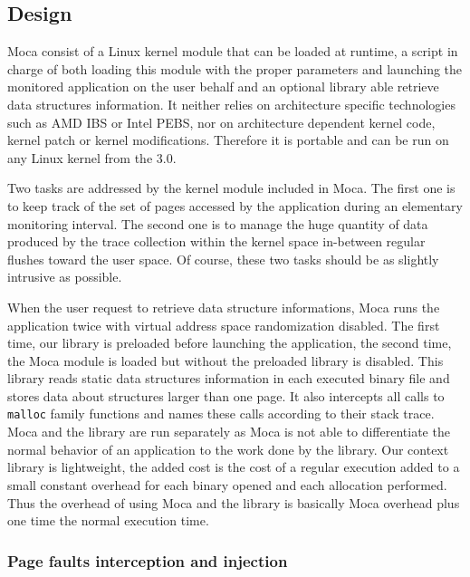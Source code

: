 \subsection{Design}

\gls{Moca} consist of a Linux kernel module that can be loaded at runtime,  a script in charge of both loading this module with the proper parameters and launching the monitored application on the user behalf and an optional library able retrieve data structures information.
It neither relies on architecture specific technologies such as \gls{AMD} \gls{IBS} or \gls{Intel} \gls{PEBS}, nor on architecture dependent kernel code, kernel patch or kernel modifications.
Therefore it is portable and can be run on any Linux kernel from the $3.0$.

Two tasks are addressed by the kernel module included in \gls{Moca}.
The first one is to keep track of the set of pages accessed by the application during an elementary monitoring interval.
The second one is to manage the huge quantity of data produced by the trace collection within the kernel space in-between regular flushes toward the user space.
Of course, these two tasks should be as slightly intrusive as possible.

When the user request to retrieve data structure informations, \gls{Moca} runs the application twice with virtual address space randomization disabled.
The first time, our library is preloaded before launching the application, the second time, the \gls{Moca} module is loaded but without the preloaded library is disabled.
This library reads static data structures information in each executed binary file and stores data about structures larger than one page.
It also intercepts all calls to \texttt{malloc} family functions and names these calls according to their stack trace.
\gls{Moca} and the library are run separately as \gls{Moca} is not able to differentiate the normal behavior of an application to the work done by the library.
Our context library is lightweight, the added cost is the cost of a regular execution added to a small constant overhead for each binary opened and each allocation performed.
Thus the overhead of using \gls{Moca} and the library is basically \gls{Moca} overhead plus one time the normal execution time.

\subsubsection{Page faults interception and injection}

